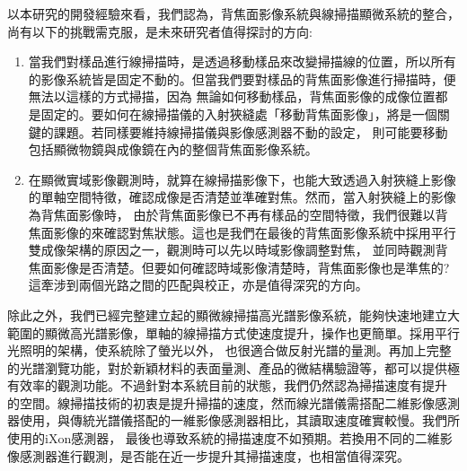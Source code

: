 \documentclass[12pt]{article}
\begin{document}
以本研究的開發經驗來看，我們認為，背焦面影像系統與線掃描顯微系統的整合，尚有以下的挑戰需克服，是未來研究者值得探討的方向:
\begin{enumerate}
    \item 當我們對樣品進行線掃描時，是透過移動樣品來改變掃描線的位置，所以所有的影像系統皆是固定不動的。但當我們要對樣品的背焦面影像進行掃描時，便無法以這樣的方式掃描，因為
    無論如何移動樣品，背焦面影像的成像位置都是固定的。要如何在線掃描儀的入射狹縫處「移動背焦面影像」，將是一個關鍵的課題。若同樣要維持線掃描儀與影像感測器不動的設定，
    則可能要移動包括顯微物鏡與成像鏡在內的整個背焦面影像系統。
    \item 在顯微實域影像觀測時，就算在線掃描影像下，也能大致透過入射狹縫上影像的單軸空間特徵，確認成像是否清楚並準確對焦。然而，當入射狹縫上的影像為背焦面影像時，
    由於背焦面影像已不再有樣品的空間特徵，我們很難以背焦面影像的來確認對焦狀態。這也是我們在最後的背焦面影像系統中採用平行雙成像架構的原因之一，觀測時可以先以時域影像調整對焦，
    並同時觀測背焦面影像是否清楚。但要如何確認時域影像清楚時，背焦面影像也是準焦的? 這牽涉到兩個光路之間的匹配與校正，亦是值得深究的方向。
\end{enumerate}

除此之外，我們已經完整建立起的顯微線掃描高光譜影像系統，能夠快速地建立大範圍的顯微高光譜影像，單軸的線掃描方式使速度提升，操作也更簡單。採用平行光照明的架構，使系統除了螢光以外，
也很適合做反射光譜的量測。再加上完整的光譜瀏覽功能，對於新穎材料的表面量測、產品的微結構驗證等，都可以提供極有效率的觀測功能。不過針對本系統目前的狀態，我們仍然認為掃描速度有提升
的空間。線掃描技術的初衷是提升掃描的速度，然而線光譜儀需搭配二維影像感測器使用，與傳統光譜儀搭配的一維影像感測器相比，其讀取速度確實較慢。我們所使用的iXon感測器，
最後也導致系統的掃描速度不如預期。若換用不同的二維影像感測器進行觀測，是否能在近一步提升其掃描速度，也相當值得深究。

\printbibliography
\end{document}
